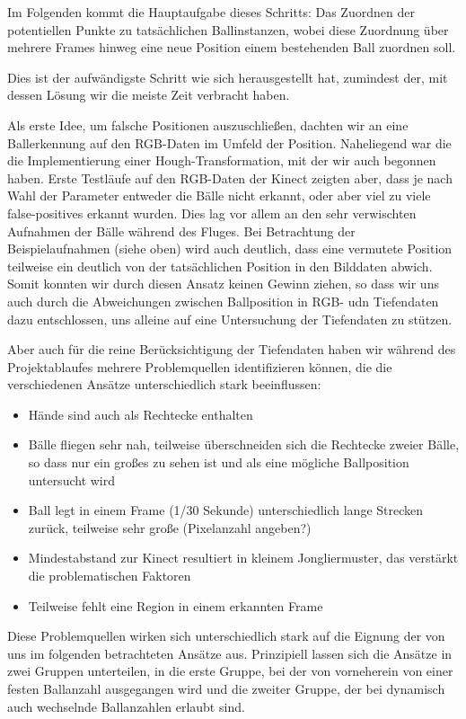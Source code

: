 \documentclass[12pt,a4paper,ngerman]{scrartcl}
\begin{document}
Im Folgenden kommt die Hauptaufgabe dieses Schritts: Das Zuordnen der potentiellen
Punkte zu tatsächlichen Ballinstanzen, wobei diese Zuordnung über mehrere Frames 
hinweg eine neue Position einem bestehenden Ball zuordnen soll.

Dies ist der aufwändigste Schritt wie sich herausgestellt hat, zumindest der, mit dessen Lösung wir die meiste Zeit verbracht haben.

Als erste Idee, um falsche Positionen auszuschließen, dachten wir an eine 
Ballerkennung auf den RGB-Daten im Umfeld der Position. Naheliegend war die die 
Implementierung einer Hough-Transformation, mit der wir auch begonnen haben.
Erste Testläufe auf den RGB-Daten der Kinect zeigten aber, dass je nach Wahl der 
Parameter entweder die Bälle nicht erkannt, oder aber viel zu viele false-positives
erkannt wurden. Dies lag vor allem an den sehr verwischten Aufnahmen der Bälle 
während des Fluges. Bei Betrachtung der Beispielaufnahmen (siehe oben) wird auch 
deutlich, dass eine vermutete Position teilweise ein deutlich von der tatsächlichen
Position in den Bilddaten abwich. Somit konnten wir durch diesen Ansatz keinen Gewinn 
ziehen, so dass wir uns auch durch die Abweichungen zwischen Ballposition in RGB- udn 
Tiefendaten dazu entschlossen, uns alleine auf eine Untersuchung der Tiefendaten zu 
stützen.

Aber auch für die reine Berücksichtigung der Tiefendaten haben wir während des 
Projektablaufes mehrere Problemquellen identifizieren können, die die verschiedenen 
Ansätze unterschiedlich stark beeinflussen:

\begin{itemize}
 \item Hände sind auch als Rechtecke enthalten 
 \item Bälle fliegen sehr nah, teilweise überschneiden sich die Rechtecke zweier Bälle, so dass nur ein großes zu sehen ist und als eine mögliche Ballposition untersucht wird
 \item Ball legt in einem Frame (1/30 Sekunde) unterschiedlich lange Strecken zurück, teilweise sehr große (Pixelanzahl angeben?) 
 \item Mindestabstand zur Kinect resultiert in kleinem Jongliermuster, das verstärkt die problematischen Faktoren
 \item Teilweise fehlt eine Region in einem erkannten Frame
\end{itemize}
 
Diese Problemquellen wirken sich unterschiedlich stark auf die Eignung der von
uns im folgenden betrachteten Ansätze aus. Prinzipiell lassen sich die Ansätze
in zwei Gruppen unterteilen, in die erste Gruppe, bei der von vorneherein von einer
festen Ballanzahl ausgegangen wird und die zweiter Gruppe, der bei dynamisch auch wechselnde Ballanzahlen erlaubt sind.
\end{document}
